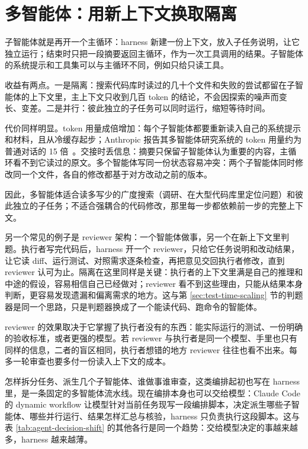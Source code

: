 \section{多智能体：用新上下文换取隔离}
\label{sec:agent-multi}

子智能体就是再开一个主循环：harness 新建一份上下文，放入子任务说明，让它独立运行；结束时只把一段摘要返回主循环，作为一次工具调用的结果。子智能体的系统提示和工具集可以与主循环不同，例如只给只读工具。

收益有两点。一是隔离：搜索代码库时读过的几十个文件和失败的尝试都留在子智能体的上下文里，主上下文只收到几百 token 的结论，不会因探索的噪声而变长、变差。二是并行：彼此独立的子任务可以同时运行，缩短等待时间。

代价同样明显。token 用量成倍增加：每个子智能体都要重新读入自己的系统提示和材料，且从冷缓存起步；Anthropic 报告其多智能体研究系统的 token 用量约为普通对话的 15 倍~\cite{anthropic2025multiagent}。交接时丢信息：摘要只保留子智能体认为重要的内容，主循环看不到它读过的原文。多个智能体写同一份状态容易冲突：两个子智能体同时修改同一个文件，各自的修改都基于对方改动之前的版本。

因此，多智能体适合读多写少的广度搜索（调研、在大型代码库里定位问题）和彼此独立的子任务；不适合强耦合的代码修改，那里每一步都依赖前一步的完整上下文。

另一个常见的例子是 reviewer 架构：一个智能体做事，另一个在新上下文里判题。执行者写完代码后，harness 开一个 reviewer，只给它任务说明和改动结果，让它读 diff、运行测试、对照需求逐条检查，再把意见交回执行者修改，直到 reviewer 认可为止。隔离在这里同样是关键：执行者的上下文里满是自己的推理和中途的假设，容易相信自己已经做对；reviewer 看不到这些理由，只能从结果本身判断，更容易发现遗漏和偏离需求的地方。这与第 \ref{sec:test-time-scaling} 节的判题器是同一个思路，只是判题器换成了一个能读代码、跑命令的智能体。

reviewer 的效果取决于它掌握了执行者没有的东西：能实际运行的测试、一份明确的验收标准，或者更强的模型。若 reviewer 与执行者是同一个模型、手里也只有同样的信息，二者的盲区相同，执行者想错的地方 reviewer 往往也看不出来。每多一轮审查也要多付一份读入上下文的成本。

怎样拆分任务、派生几个子智能体、谁做事谁审查，这类编排起初也写在 harness 里，是一条固定的多智能体流水线。现在编排本身也可以交给模型：Claude Code 的 dynamic workflow 让模型针对当前任务现写一段编排脚本，决定派生哪些子智能体、哪些并行运行、结果怎样汇总与核验，harness 只负责执行这段脚本。这与表 \ref{tab:agent-decision-shift} 的其他各行是同一个趋势：交给模型决定的事越来越多，harness 越来越薄。

